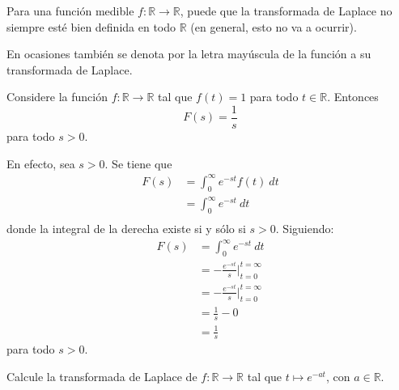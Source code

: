 \documentclass[12pt]{report}
\theoremstyle{largebreak}
\newcommand\cf[3]{\ensuremath{#1:#2\rightarrow#3}}
\begin{document}
    \begin{obs}
        Para una función medible $\cf{f}{\mathbb{R}}{\mathbb{R}}$, puede que la transformada de Laplace no siempre esté bien definida en todo $\mathbb{R}$ (en general, esto no va a ocurrir).

        En ocasiones también se denota por la letra mayúscula de la función a su transformada de Laplace.
    \end{obs}

    \begin{exa}
        Considere la función $\cf{f}{\mathbb{R}}{\mathbb{R}}$ tal que $f(t)=1$ para todo $t\in\mathbb{R}$. Entonces
        \begin{equation*}
            F(s)=\frac{1}{s}
        \end{equation*}
        para todo $s>0$.
    \end{exa}

    \begin{sol}
        En efecto, sea $s>0$. Se tiene que
        \begin{equation*}
            \begin{split}
                F(s)&=\int_{0}^\infty e^{ -st}f(t)\:dt\\
                &=\int_{0}^\infty e^{ -st}\:dt\\
            \end{split}
        \end{equation*}
        donde la integral de la derecha existe si y sólo si $s>0$. Siguiendo:
        \begin{equation*}
            \begin{split}
                F(s)&=\int_{0}^\infty e^{ -st}\:dt\\
                &=-\frac{e^{ -st}}{s}\Big|_{ t=0}^{ t=\infty}\\
                &=-\frac{e^{ -st}}{s}\Big|_{ t=0}^{ t=\infty}\\
                &=\frac{1}{s}-0\\
                &=\frac{1}{s}
            \end{split}
        \end{equation*}
        para todo $s>0$.
    \end{sol}

    \begin{excer}
        Calcule la transformada de Laplace de $\cf{f}{\mathbb{R}}{\mathbb{R}}$ tal que $t\mapsto e^{ -at}$, con $a\in\mathbb{R}$.
    \end{excer}
\end{document}
